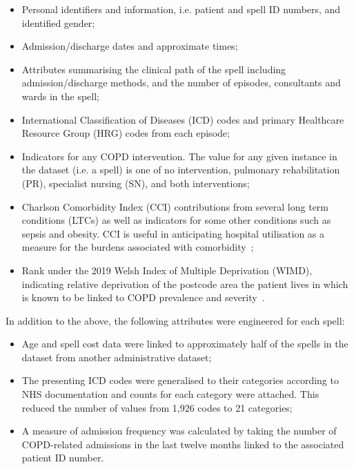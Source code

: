 \documentclass[]{interact}
\theoremstyle{plain}%
\theoremstyle{definition}
\theoremstyle{remark}
\begin{document}
\begin{itemize}
    \item Personal identifiers and information, i.e. patient and spell ID
        numbers, and identified gender;
    \item Admission/discharge dates and approximate times;
    \item Attributes summarising the clinical path of the spell including
        admission/discharge methods, and the number of episodes, consultants and
        wards in the spell;
    \item International Classification of Diseases (ICD) codes and primary
        Healthcare Resource Group (HRG) codes from each episode;
    \item Indicators for any COPD intervention. The value for any given instance
        in the dataset (i.e. a spell) is one of no intervention, pulmonary
        rehabilitation (PR), specialist nursing (SN), and both interventions;
    \item Charlson Comorbidity Index (CCI) contributions from several long term
        conditions (LTCs) as well as indicators for some other conditions such
        as sepsis and obesity. CCI is useful in anticipating hospital
        utilisation as a measure for the burdens associated with
        comorbidity~\cite{Simon2011};
    \item Rank under the 2019 Welsh Index of Multiple Deprivation (WIMD),
        indicating relative deprivation of the postcode area the patient lives
        in which is known to be linked to COPD prevalence and
        severity~\cite{Collins2018,Sexton2016,Steiner2017}.
\end{itemize}

In addition to the above, the following attributes were engineered for each
spell:

\begin{itemize}
    \item Age and spell cost data were linked to approximately half of the
        spells in the dataset from another administrative dataset;
    \item The presenting ICD codes were generalised to their categories
        according to NHS documentation and counts for each category were
        attached. This reduced the number of values from
        1,926 codes to 21 categories;
    \item A measure of admission frequency was calculated by taking the number
        of COPD-related admissions in the last twelve months linked to the
        associated patient ID number.
\end{itemize}
\end{document}
